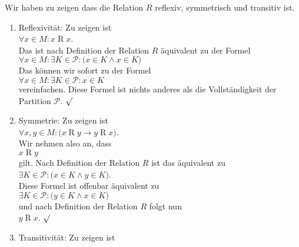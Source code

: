 \proof
Wir haben zu zeigen dass die Relation $R$ reflexiv, symmetrisch und
transitiv ist.
\begin{enumerate}
\item Reflexivit\"{a}t: Zu zeigen ist 
      \\[0.2cm]
      \hspace*{1.3cm}
      $\forall x \in M: x \mathop{R} x$.
      \\[0.2cm]
      Das ist nach Definition der Relation $R$ \"{a}quivalent zu der Formel 
      \\[0.2cm]
      \hspace*{1.3cm}
      $\forall x \in M: \exists K \in \mathcal{P}: \bigl(x \in K \wedge x \in K\bigr)$
      \\[0.2cm]
      Das k\"{o}nnen wir sofort zu der Formel
      \\[0.2cm]
      \hspace*{1.3cm}
      $\forall x \in M: \exists K \in \mathcal{P}: x \in K$
      \\[0.2cm]
      vereinfachen.  Diese Formel ist nichts anderes als die Vollst\"{a}ndigkeit
      der Partition $\mathcal{P}$. $\surd$
\item Symmetrie: Zu zeigen ist 
      \\[0.2cm]
      \hspace*{1.3cm}
      $\forall x, y \in M:\bigl( x \mathop{R} y \rightarrow y \mathop{R} x\bigr)$.
      \\[0.2cm]
      Wir nehmen also an, dass 
      \\[0.2cm]
      \hspace*{1.3cm}
      $x \mathop{R} y$ 
      \\[0.2cm]
      gilt.  Nach Definition
      der Relation $R$ ist das \"{a}quivalent zu 
      \\[0.2cm]
      \hspace*{1.3cm}
      $\exists K \in \mathcal{P}: \bigl(x \in K \wedge y \in K\bigr)$.
      \\[0.2cm]
      Diese Formel ist offenbar \"{a}quivalent zu 
      \\[0.2cm]
      \hspace*{1.3cm}
      $\exists K \in \mathcal{P}: \bigl(y \in K \wedge x \in K\bigr)$
      \\[0.2cm]
      und nach Definition der Relation $R$ folgt nun 
      \\[0.2cm]
      \hspace*{1.3cm}
      $y \mathop{R} x$. $\surd$
\item Transitivit\"{a}t: Zu zeigen ist 

\end{enumerate}
